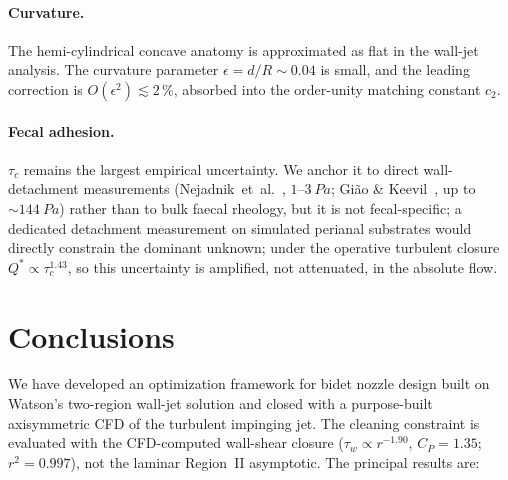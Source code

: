\documentclass[aps,prfluids,reprint,amsmath,amssymb,floatfix]{revtex4-2}
\begin{document}
\paragraph{Curvature.}
The hemi-cylindrical concave anatomy is approximated as flat in the
wall-jet analysis. The curvature parameter $\epsilon = d/R \sim 0.04$
is small, and the leading correction is $O(\epsilon^2) \lesssim 2$\,\%,
absorbed into the order-unity matching constant $c_2$.

\paragraph{Fecal adhesion.}
$\tau_c$ remains the largest empirical uncertainty. We anchor it to direct
wall-detachment measurements (Nejadnik~et~al.~\citep{Nejadnik2008},
$1$--$\SI{3}{Pa}$; Gi\~ao \& Keevil~\citep{Giao2013}, up to
$\sim\SI{144}{Pa}$) rather than to bulk faecal rheology, but it is not
fecal-specific; a dedicated detachment measurement on simulated perianal
substrates would directly constrain the dominant unknown; under the operative
turbulent closure $Q^* \propto \tau_c^{1.43}$, so this uncertainty is amplified,
not attenuated, in the absolute flow.

\section{Conclusions}
\label{sec:conclusions}

We have developed an optimization framework for bidet nozzle design built on
Watson's two-region wall-jet solution and closed with a purpose-built
axisymmetric CFD of the turbulent impinging jet. The cleaning constraint is
evaluated with the CFD-computed wall-shear closure ($\tau_w \propto r^{-1.90}$,
$C_P = 1.35$; $r^2 = 0.997$), not the laminar Region~II asymptotic. The
principal results are:
\end{document}
